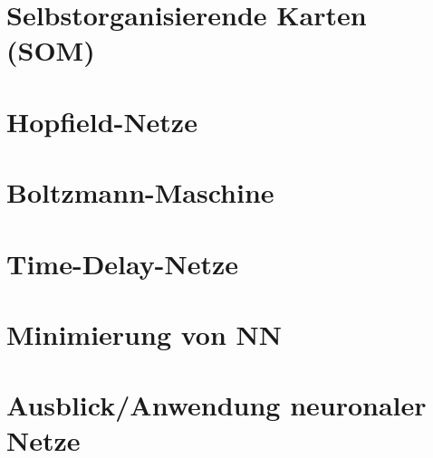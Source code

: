 \documentclass[fleqn,10pt]{SelfArx} %
\begin{document}
\section{Selbstorganisierende Karten (SOM)}


\section{Hopfield-Netze}


\section{Boltzmann-Maschine}


\section{Time-Delay-Netze}


\section{Minimierung von NN}


\section{Ausblick/Anwendung neuronaler Netze}


\end{document}
